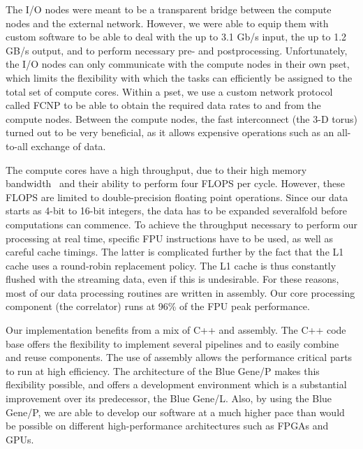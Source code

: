 \documentclass{sig-alternate}
\begin{document}
The I/O nodes were meant to be a transparent bridge between the compute nodes and the external network. However, we were able to equip them with custom software to be able to deal with the up to 3.1 Gb/s input, the up to 1.2 GB/s output, and to perform necessary pre- and postprocessing. Unfortunately, the I/O nodes can only communicate with the compute nodes in their own pset, which limits the flexibility with which the tasks can efficiently be assigned to the total set of compute cores. Within a pset, we use a custom network protocol called FCNP to be able to obtain the required data rates to and from the compute nodes. Between the compute nodes, the fast interconnect (the 3-D torus) turned out to be very beneficial, as it allows expensive operations such as an all-to-all exchange of data.

The compute cores have a high throughput, due to their high memory bandwidth~\cite{Nieuwpoort:09} and their ability to perform four FLOPS per cycle. However, these FLOPS are limited to double-precision floating point operations. Since our data starts as 4-bit to 16-bit integers, the data has to be expanded severalfold before computations can commence. To achieve the throughput necessary to perform our processing at real time, specific FPU instructions have to be used, as well as careful cache timings. The latter is complicated further by the fact that the L1 cache uses a round-robin replacement policy. The L1 cache is thus constantly flushed with the streaming data, even if this is undesirable. For these reasons, most of our data processing routines are written in assembly. Our core processing component (the correlator) runs at 96\% of the FPU peak performance. 


Our implementation benefits from a mix of C++ and assembly. The C++ code base offers the flexibility
to implement several pipelines and to easily combine and reuse components. The use of assembly allows
the performance critical parts to run at high efficiency. The architecture of the Blue Gene/P makes this
flexibility possible, and offers a development environment which is a substantial improvement over
its predecessor, the Blue Gene/L. Also, by using the Blue Gene/P, we are able to develop our software at a much higher pace than would be possible on different high-performance architectures such as FPGAs and GPUs.
\end{document}
